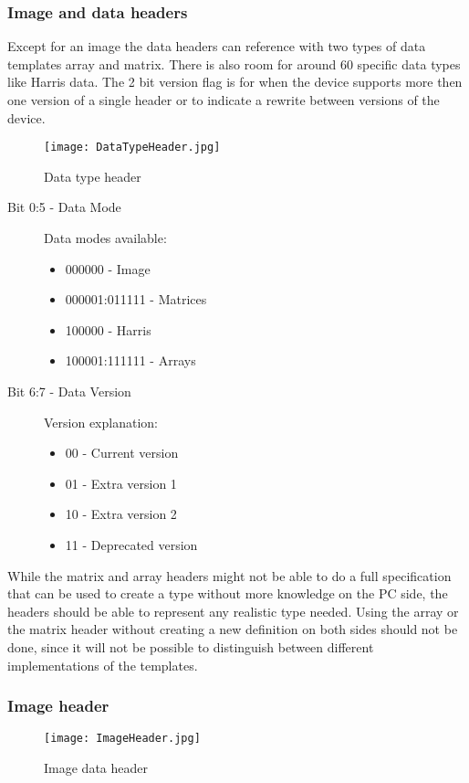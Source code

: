 \subsubsection*{Image and data headers}
Except for an image the data headers can reference with two types of data templates array and matrix. There is also room for around 60 specific data types like Harris data. The 2 bit version flag is for when the device supports more then one version of a single header or to indicate a rewrite between versions of the device. 

\begin{figure}
\centering
\texttt{[image: DataTypeHeader.jpg]}
\caption{Data type header}
\label{fig:DataTypeHeader}
\end{figure}

\begin{description}
\item [Bit 0:5 - Data Mode] Data modes available:
	\begin{itemize}
	\item 000000 - Image
	\item 000001:011111	- Matrices
	\item 100000 -  Harris
	\item 100001:111111 - Arrays
	\end{itemize}
\item [Bit 6:7 - Data Version] Version explanation:
	\begin{itemize}
	\item 00 - Current version
	\item 01 - Extra version 1
	\item 10 - Extra version 2
	\item 11 - Deprecated version
	\end{itemize}
\end{description}
While the matrix and array headers might not be able to do a full specification that can be used to create a type without more knowledge on the PC side, the headers should be able to represent any realistic type needed. Using the array or the matrix header without creating a new definition on both sides should not be done, since it will not be possible to distinguish between different implementations of the templates. 
\subsubsection*{Image header}
\begin{figure}
\centering
\texttt{[image: ImageHeader.jpg]}
\caption{Image data header}
\label{fig:ImageHeader}
\end{figure}

